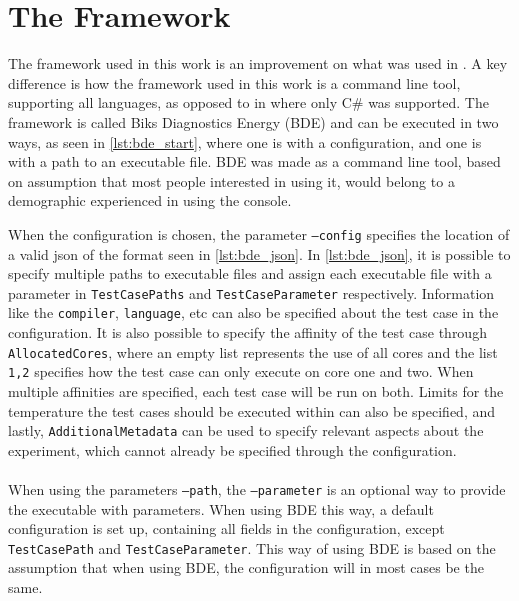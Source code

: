\section{The Framework}\label{app:framework}

The framework used in this work is an improvement on what was used in \cite{biksbois}. A key difference is how the framework used in this work is a command line tool, supporting all languages, as opposed to in \cite{biksbois} where only C\# was supported. The framework is called Biks Diagnostics Energy (BDE) and can be executed in two ways, as seen in \cref{lst:bde_start}, where one is with a configuration, and one is with a path to an executable file. BDE was made as a command line tool, based on assumption that most people interested in using it, would belong to a demographic experienced in using the console.



When the configuration is chosen, the parameter \texttt{--config} specifies the location of a valid json of the format seen in \cref{lst:bde_json}. In \cref{lst:bde_json}, it is possible to specify multiple paths to executable files and assign each executable file with a parameter in \texttt{TestCasePaths} and \texttt{TestCaseParameter} respectively. Information like the \texttt{compiler}, \texttt{language}, etc can also be specified about the test case in the configuration. It is also possible to specify the affinity of the test case through \texttt{AllocatedCores}, where an empty list represents the use of all cores and the list \texttt{1,2} specifies how the test case can only execute on core one and two. When multiple affinities are specified, each test case will be run on both. Limits for the temperature the test cases should be executed within can also be specified, and lastly, \texttt{AdditionalMetadata} can be used to specify relevant aspects about the experiment, which cannot already be specified through the configuration.



\paragraph*{}
When using the parameters \texttt{--path}, the \texttt{--parameter} is an optional way to provide the executable with parameters. When using BDE this way, a default configuration is set up, containing all fields in the configuration, except \texttt{TestCasePath} and \texttt{TestCaseParameter}. This way of using BDE is based on the assumption that when using BDE, the configuration will in most cases be the same.
\newpage

